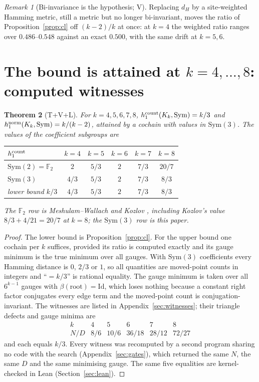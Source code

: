\documentclass[11pt]{article}
\newtheorem{theorem}{Theorem}\newtheorem{proposition}[theorem]{Proposition}\newtheorem{corollary}[theorem]{Corollary}
\theoremstyle{remark}\newtheorem{remark}[theorem]{Remark}
\newcommand{\Sym}{\mathrm{Sym}}\newcommand{\dH}{d_H}\newcommand{\F}{\mathbb{F}}\newcommand{\Z}{\mathbb{Z}}
\newcommand{\Id}{\mathrm{Id}}\newcommand{\Tr}{\operatorname{Tr}}
\begin{document}
\begin{remark}[Bi-invariance is the hypothesis; V]
Replacing $\dH$ by a site-weighted Hamming metric, still a metric but no longer bi-invariant, moves the ratio of Proposition~\ref{prop:cl} off $(k-2)/k$ at once: at $k=4$ the weighted ratio ranges over $0.486$--$0.548$ against an exact $0.500$, with the same drift at $k=5,6$.
\end{remark}

\section{The bound is attained at \texorpdfstring{$k=4,\dots,8$}{k=4..8}: computed witnesses}\label{sec:small}
\begin{theorem}[T+V+L]\label{thm:small}
For $k=4,5,6,7,8$, $h_1^{\rm count}(K_k,\Sym)=k/3$ and $h_1^{\rm norm}(K_k,\Sym)=k/(k-2)$, attained by a cochain with values in $\Sym(3)$. The values of the coefficient subgroups are
\begin{center}
\begin{tabular}{lccccc}\toprule
$h_1^{\rm count}$ & $k=4$ & $k=5$ & $k=6$ & $k=7$ & $k=8$\\\midrule
$\Sym(2)=\F_2$ & $2$ & $5/3$ & $2$ & $7/3$ & $20/7$ \\
$\Sym(3)$ & $4/3$ & $5/3$ & $2$ & $7/3$ & $8/3$\\
lower bound $k/3$ & $4/3$ & $5/3$ & $2$ & $7/3$ & $8/3$\\\bottomrule
\end{tabular}
\end{center}
The $\F_2$ row is Meshulam--Wallach and Kozlov \cite{MW,Koz}, including Kozlov's value $8/3+4/21=20/7$ at $k=8$; the $\Sym(3)$ row is this paper.
\end{theorem}
\begin{proof}
The lower bound is Proposition~\ref{prop:cl}. For the upper bound one cochain per $k$ suffices, provided its ratio is computed exactly and its gauge minimum is the true minimum over all gauges. With $\Sym(3)$ coefficients every Hamming distance is $0$, $2/3$ or $1$, so all quantities are moved-point counts in integers and ``$=k/3$'' is rational equality. The gauge minimum is taken over all $6^{k-1}$ gauges with $\beta(\text{root})=\Id$, which loses nothing because a constant right factor conjugates every edge term and the moved-point count is conjugation-invariant. The witnesses are listed in Appendix~\ref{sec:witnesses}; their triangle defects and gauge minima are
\[
\begin{array}{c|ccccc}
k&4&5&6&7&8\\\hline N/D & 8/6 & 10/6 & 36/18 & 28/12 & 72/27
\end{array}
\]
and each equals $k/3$. Every witness was recomputed by a second program sharing no code with the search (Appendix~\ref{sec:gates}), which returned the same $N$, the same $D$ and the same minimising gauge. The same five equalities are kernel-checked in Lean (Section~\ref{sec:lean}).
\end{proof}
\end{document}
